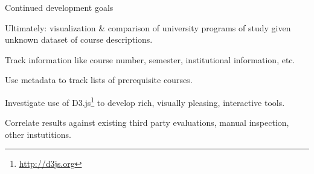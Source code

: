 \begin{frame}{Continued development goals}

  Ultimately: visualization \& comparison of university programs of study
  given unknown dataset of course descriptions.

  \begin{description}
    {\color{green}\item[Metadata awareness] Track information like course number,
      semester, institutional information, etc.}
    \item[Prerequisite chains] Use metadata to track lists of
    prerequisite courses.
    \item[Rich visualizations] Investigate use of
    D3.js\footnote{\url{http://d3js.org}} to develop rich, visually
    pleasing, interactive tools.
    \item[Evaluation suite] Correlate results against existing third
    party evaluations, manual inspection, other instutitions.
  \end{description}

\end{frame}
